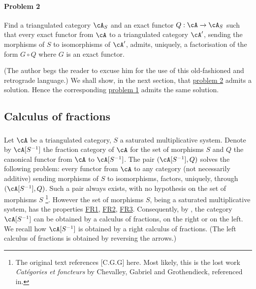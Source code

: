 \paragraph{Problem 2}
\hypertarget{VIII:prob2}{}
Find a triangulated category $\cA_S$ and an exact functor
$Q:\cA\to \cA_S$ such that every exact functor from $\cA$ to a
triangulated category $\cA'$, sending the morphisms of $S$ to isomorphisms of
$\cA'$, admits, uniquely, a factorisation of the form
$G\circ Q$ where $G$ is an exact functor.

(The author begs the reader to excuse him for the use of this
old-fashioned and retrograde language.) We shall show, in the next
section, that \hyperlink{VIII:prob2}{problem 2} admits a solution. Hence
the corresponding \hyperlink{VIII:prob1}{problem 1} admits the same solution. 










\subsection{Calculus of fractions}\label{VIII:2-3}





\subsubsection{}\label{VIII:2-3-1}

Let $\cA$ be a triangulated category, $S$ a saturated
multiplicative system. Denote by $\cA[S^{-1}]$ the fraction category of $\cA$
for the set of morphisms $S$ and $Q$ the canonical functor from $\cA$ to
$\cA[S^{-1}]$. The pair $(\cA[S^{-1}],Q)$ solves the following problem: every
functor from $\cA$ to any category (not necessarily
additive) sending morphisms of $S$ to isomorphisms, factors, uniquely,
through $(\cA[S^{-1}],Q)$. Such a pair always exists, with no
hypothesis on the set of morphisms $S$ \cite[1.1]{gz67}\footnote{The
original text references [C.G.G] here. Most likely, this is the lost work
\emph{Catégories et foncteurs} by Chevalley, Gabriel and Grothendieck,
referenced in\cite{sc72}. }. However the set
of morphisms $S$, being a saturated multiplicative system, has the
properties \hyperlink{VIII:FR1}{FR1}, \hyperlink{VIII:FR2}{FR2},
\hyperlink{VIII:FR3}{FR3}. Consequently, by \cite{gz67}, the category
$\cA[S^{-1}]$ can be obtained by a calculus of fractions, on the right or on the
left. We recall how $\cA[S^{-1}]$ is obtained by a right
calculus of fractions. (The left calculus of fractions is obtained by
reversing the arrows.) 





